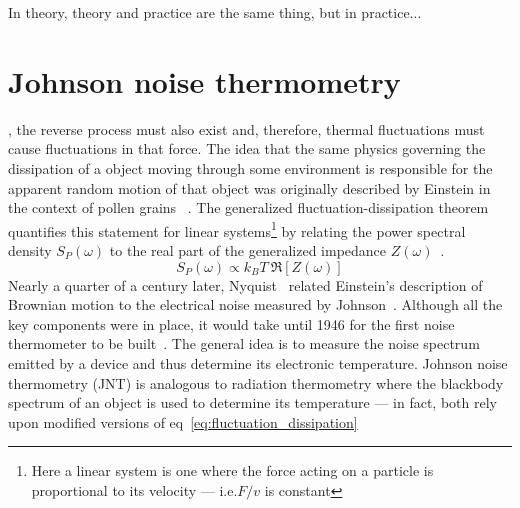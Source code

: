\begin{savequote}[75mm]
In theory, theory and practice are the same thing, but in practice...
\end{savequote}

\chapter{Johnson noise thermometry}
\label{ch:johnson_noise_thermometry}

, the reverse process must also exist and, therefore, thermal fluctuations must cause fluctuations in that force. The idea that the same physics governing the dissipation of a object moving through some environment is responsible for the apparent random motion of that object was originally described by Einstein in the context of pollen grains ~\cite{einstein_investigations_1956}. The generalized fluctuation-dissipation theorem~\cite{kubo_fluctuation-dissipation_1966} quantifies this statement for linear systems\footnote{Here a linear system is one where the force acting on a particle is proportional to its velocity --- i.e.$F/v$ is constant} by relating the power spectral density $S_P(\omega)$ to the real part of the generalized impedance $Z(\omega)$~\cite{callen_irreversibility_1951}.
\begin{equation}\label{eq:fluctuation_dissipation}
S_P(\omega) \propto k_BT\ \Re[Z(\omega)]
\end{equation}
Nearly a quarter of a century later, Nyquist~\cite{nyquist_thermal_1928} related Einstein's description of Brownian motion to the electrical noise measured by Johnson~\cite{johnson_thermal_1927,johnson_thermal_1928}. Although all the key components were in place, it would take until 1946 for the first noise thermometer to be built~\cite{dicke_measurement_1946}. The general idea is to measure the noise spectrum emitted by a device and thus determine its electronic temperature. Johnson noise thermometry (JNT) is analogous to radiation thermometry where the blackbody spectrum of an object is used to determine its temperature --- in fact, both rely upon modified versions of eq~\ref{eq:fluctuation_dissipation}

